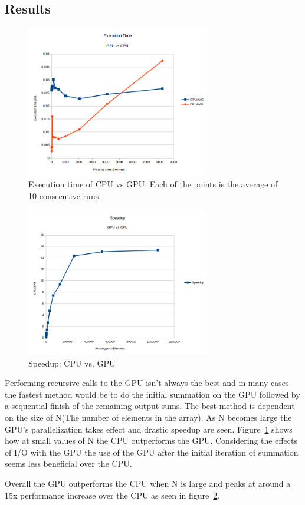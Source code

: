 \documentclass[letterpaper,twocolumn]{article}
\begin{document}
\subsection{Results}
\begin{figure}
  \centering
  \includegraphics[width=8cm]{execution_time_short.png}
  \caption{Execution time of CPU vs GPU. Each of the points is the average of 10 consecutive runs.}
  \label{fig:execution_short}
\end{figure}
\begin{figure}
  \centering\includegraphics[width=8cm]{speedup.png}
  \caption{Speedup: CPU vs. GPU}
  \label{fig:speedup}
\end{figure}

Performing recursive calls to the GPU isn't always the best and in many cases the fastest method would be to do the initial summation on the GPU followed by a sequential finish of the remaining output sums. The best method is dependent on the size of N(The number of elements in the array). As N becomes large the GPU's parallelization takes effect and drastic speedup are seen. Figure~\ref{fig:execution_short} shows how at small values of N the CPU outperforms the GPU. Considering the effects of I/O with the GPU the use of the GPU after the initial iteration of summation seems less beneficial over the CPU.

Overall the GPU outperforms the CPU when N is large and peaks at around a 15x performance increase over the CPU as seen in figure~\ref{fig:speedup}.
\end{document}
